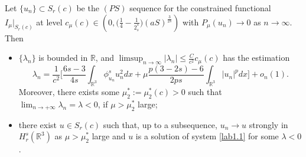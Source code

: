 \documentclass[reqno]{amsart}
\begin{document}
\begin{lemma}\label{rem5.91} 
Let $\{u_n\} \subset S_r(c)$ be the  $(PS)$ sequence for the constrained functional
 $I_\mu|_{S_r(c)}$ at level 
 $c_\mu(c)\in \left(0, \Big(\frac{1}{4}-\frac{1}{2^*_s}\Big)(aS)^{\frac{3}{2s}}\right)$ 
with $P_\mu(u_n)\to 0$ as $n\to \infty$. Then
\begin{itemize}
\item[(i)] $\{\lambda_n\}$ is bounded in $\mathbb{R}$, and 
$\limsup_{n\to \infty}|\lambda_n|\leq \frac{C}{c^2}c_\mu(c)$ has the  
estimation
$$
\lambda_n=\frac{1}{c^2}\Big[\frac{6s-3}{4s}\int_{\mathbb{R}^3}\phi^s_{u_n} u^2_ndx
+\mu \frac{p(3-2s)-6}{2ps}\int_{\mathbb{R}^3}|u_n|^pdx\Big]+o_n(1).
$$
Moreover, there exists some $\mu^*_2:=\mu^*_2(c)>0$ such that 
$\lim_{n\to +\infty}\lambda_n=\lambda<0$, if $\mu> \mu^*_2$ large;

\item[(ii)] there exist $u\in S_r(c)$ such that, up to a subsequence, 
$u_n\to u$ strongly in $H^s_r(\mathbb{R}^3)$ as  $\mu> \mu^*_2$ large and 
$u$ is a solution of  system \eqref{lab1.1} for some $\lambda<0$.
\end{itemize}
\end{lemma}
\end{document}
